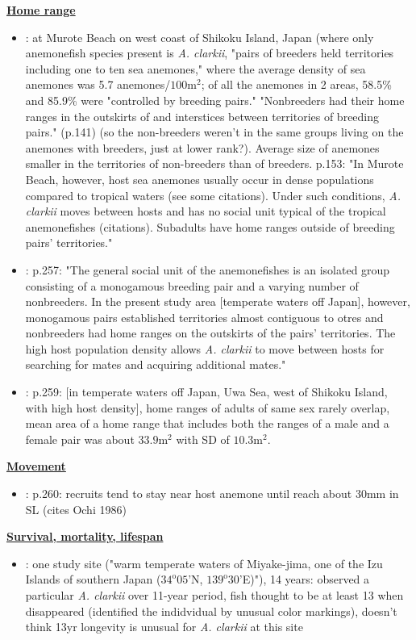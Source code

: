 \documentclass[12pt, oneside]{article}   	%
\begin{document}
\textbf{\underline{Home range}}
\begin{itemize}
\item \cite{hattori1991life}: at Murote Beach on west coast of Shikoku Island, Japan (where only anemonefish species present is \textit{A. clarkii}, "pairs of breeders held territories including one to ten sea anemones," where the average density of sea anemones was 5.7 anemones/$100\text{m}^2$; of all the anemones in 2 areas, 58.5\% and 85.9\% were "controlled by breeding pairs." "Nonbreeders had their home ranges in the outskirts of and interstices between territories of breeding pairs." (p.141) (so the non-breeders weren't in the same groups living on the anemones with breeders, just at lower rank?). Average size of anemones smaller in the territories of non-breeders than of breeders. p.153: "In Murote Beach, however, host sea anemones usually occur in dense populations compared to tropical waters (see some citations). Under such conditions, \textit{A. clarkii} moves between hosts and has no social unit typical of the tropical anemonefishes (citations). Subadults have home ranges outside of breeding pairs' territories."
\item \cite{ochi1989mating}: p.257: "The general social unit of the anemonefishes is an isolated group consisting of a monogamous breeding pair and a varying number of nonbreeders. In the present study area [temperate waters off Japan], however, monogamous pairs established territories almost contiguous to otres and nonbreeders had home ranges on the outskirts of the pairs' territories. The high host population density allows \textit{A. clarkii} to move between hosts for searching for mates and acquiring additional mates."
\item \cite{ochi1989mating}: p.259: [in temperate waters off Japan, Uwa Sea, west of Shikoku Island, with high host density], home ranges of adults of same sex rarely overlap, mean area of a home range that includes both the ranges of a male and a female pair was about $33.9\text{m}^2$ with SD of $10.3\text{m}^2$.
\end{itemize}

\textbf{\underline{Movement}}
\begin{itemize}
\item \cite{ochi1989mating}: p.260: recruits tend to stay near host anemone until reach about 30mm in SL (cites Ochi 1986)
\end{itemize}

\textbf{\underline{Survival, mortality, lifespan}}
\begin{itemize}
\item \cite{moyer1986longevity}: one study site ("warm temperate waters of Miyake-jima, one of the Izu Islands of southern Japan ($34^{\text{o}}05$'N, $139^{\text{o}}30$'E)"), 14 years: observed a particular \textit{A. clarkii} over 11-year period, fish thought to be at least 13 when disappeared (identified the indidvidual by unusual color markings), doesn't think 13yr longevity is unusual for \textit{A. clarkii} at this site
\end{itemize}
\end{document}
